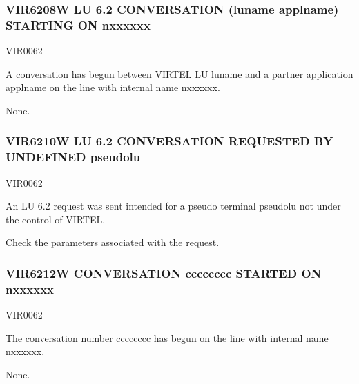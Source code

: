 \documentclass[letterpaper,10pt,english]{sphinxmanual}
\begin{document}
\subsubsection{VIR6208W LU 6.2 CONVERSATION (luname \textendash{} applname) STARTING ON n\sphinxhyphen{}xxxxxx}
\label{\detokenize{messages:vir6208w-lu-6-2-conversation-luname-applname-starting-on-n-xxxxxx}}\begin{description}
\sphinxAtStartPar
VIR0062

\sphinxAtStartPar
A conversation has begun between VIRTEL LU luname and a partner application applname on the line with internal name n\sphinxhyphen{}xxxxxx.

\sphinxAtStartPar
None.

\end{description}


\subsubsection{VIR6210W LU 6.2 CONVERSATION REQUESTED BY UNDEFINED pseudolu}
\label{\detokenize{messages:vir6210w-lu-6-2-conversation-requested-by-undefined-pseudolu}}\begin{description}
\sphinxAtStartPar
VIR0062

\sphinxAtStartPar
An LU 6.2 request was sent intended for a pseudo terminal pseudolu not under the control of VIRTEL.

\sphinxAtStartPar
Check the parameters associated with the request.

\end{description}


\subsubsection{VIR6212W CONVERSATION cccccccc STARTED  ON n\sphinxhyphen{}xxxxxx}
\label{\detokenize{messages:vir6212w-conversation-cccccccc-started-on-n-xxxxxx}}\begin{description}
\sphinxAtStartPar
VIR0062

\sphinxAtStartPar
The conversation number cccccccc has begun on the line with internal name n\sphinxhyphen{}xxxxxx.

\sphinxAtStartPar
None.

\end{description}
\end{document}
